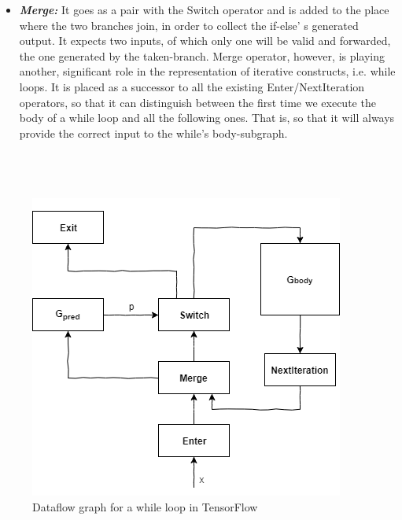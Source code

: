 \documentclass[ack,preface]{dithesis}
\begin{document}
\begin{itemize}
    \item \textit{\textbf{Merge:}} It goes as a pair with the Switch operator and is added to the place where the two branches join, in order to collect the if-else' s generated output. It expects two inputs, of which only one will be valid and forwarded, the one generated by the taken-branch. Merge operator, however, is playing another, significant role in the representation of iterative constructs, i.e. while loops. It is placed as a successor to all the existing Enter/NextIteration operators, so that it can distinguish between the first time we execute the body of a while loop and all the following ones. That is, so that  it will always provide the correct input to the while's body-subgraph. \\\\\\\\

    \end{itemize}

\begin{figure}
\centering
\includegraphics[scale=0.85]{figures/while}
\caption{ Dataflow graph for a while loop in TensorFlow}
\end{figure}
\end{document}
